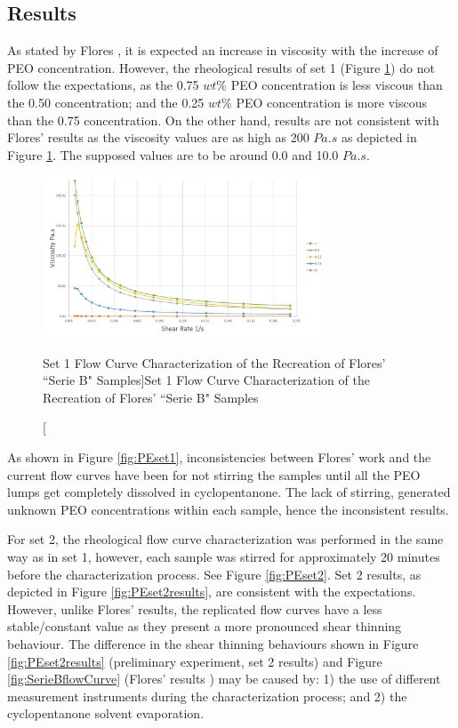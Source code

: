 \subsection{Results}

As stated by Flores \cite{Flores2017}, it is expected an increase in viscosity with the increase of PEO concentration. However, the rheological results of set 1 (Figure \ref{fig:PEset1results}) do not follow the expectations, as the 0.75 $w t \%$ PEO concentration is less viscous than the 0.50 concentration; and the 0.25 $w t \%$ PEO concentration is more viscous than the 0.75 concentration. On the other hand, results are not consistent with Flores' results as the viscosity values are as high as 200 $Pa.s$ as depicted in Figure \ref{fig:PEset1results}. The supposed values are to be around 0.0 and 10.0 $Pa.s$. 

\begin{figure}[th]
\centering
\includegraphics[width=0.75\textwidth]{./Figures/PEset1results.png}
\decoRule
\caption[Set 1 Flow Curve Characterization of the Recreation of Flores' ``Serie B" Samples]{Set 1 Flow Curve Characterization of the Recreation of Flores' ``Serie B" Samples}
\label{fig:PEset1results}
\end{figure}

As shown in Figure \ref{fig:PEset1}, inconsistencies between Flores' work and the current flow curves have been for not stirring the samples until all the PEO lumps get completely dissolved in cyclopentanone. The lack of stirring, generated unknown PEO concentrations within each sample, hence the inconsistent results.

For set 2, the rheological flow curve characterization was performed in the same way as in set 1, however, each sample was stirred for approximately 20 minutes before the characterization process. See Figure \ref{fig:PEset2}. Set 2 results, as depicted in Figure \ref{fig:PEset2results}, are consistent with the expectations. However, unlike Flores' results, the replicated flow curves have a less stable/constant value as they present a more pronounced shear thinning behaviour. The difference in the shear thinning behaviours shown in Figure \ref{fig:PEset2results} (preliminary experiment, set 2 results) and Figure \ref{fig:SerieBflowCurve} (Flores' results \cite{Flores2017}) may be caused by: 1) the use of different measurement instruments during the characterization process; and 2) the cyclopentanone solvent evaporation.

